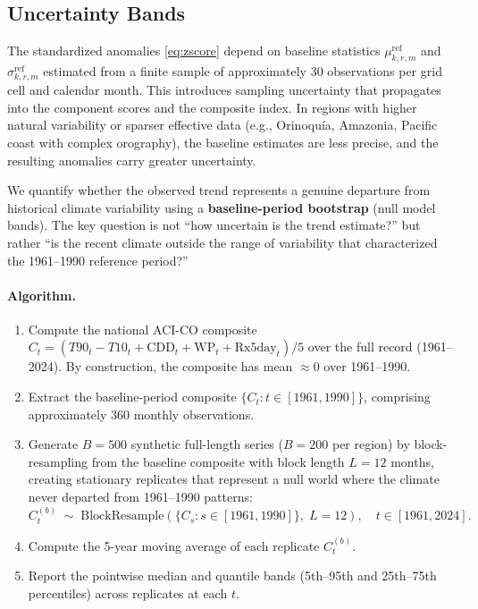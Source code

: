 \documentclass[12pt]{article}
\begin{document}
\subsection{Uncertainty Bands}\label{sec:uncertainty}
 
The standardized anomalies \eqref{eq:zscore} depend on baseline statistics $\mu^{\mathrm{ref}}_{k,r,m}$ and $\sigma^{\mathrm{ref}}_{k,r,m}$ estimated from a finite sample of approximately 30 observations per grid cell and calendar month. This introduces sampling uncertainty that propagates into the component scores and the composite index. In regions with higher natural variability or sparser effective data (e.g., Orinoquía, Amazonia, Pacific coast with complex orography), the baseline estimates are less precise, and the resulting anomalies carry greater uncertainty.
 
We quantify whether the observed trend represents a genuine departure from historical climate variability using a \textbf{baseline-period bootstrap} (null model bands). The key question is not ``how uncertain is the trend estimate?'' but rather ``is the recent climate outside the range of variability that characterized the 1961--1990 reference period?''

\paragraph{Algorithm.}
\begin{enumerate}
\item Compute the national ACI-CO composite $C_t = (T90_t - T10_t + \mathrm{CDD}_t + \mathrm{WP}_t + \mathrm{Rx5day}_t)/5$ over the full record (1961--2024). By construction, the composite has mean $\approx 0$ over 1961--1990.
\item Extract the baseline-period composite $\{C_t : t \in [1961, 1990]\}$, comprising approximately 360 monthly observations.
\item Generate $B = 500$ synthetic full-length series ($B=200$ per region) by block-resampling from the baseline composite with block length $L = 12$ months, creating stationary replicates that represent a null world where the climate never departed from 1961--1990 patterns:
\begin{equation}
C^{(b)}_t \;\sim\; \mathrm{BlockResample}\!\left(\{C_s : s \in [1961,1990]\},\; L=12\right), \quad t \in [1961, 2024].
\end{equation}
\item Compute the 5-year moving average of each replicate $C^{(b)}_t$.
\item Report the pointwise median and quantile bands (5th--95th and 25th--75th percentiles) across replicates at each $t$.
\end{enumerate}
\end{document}
